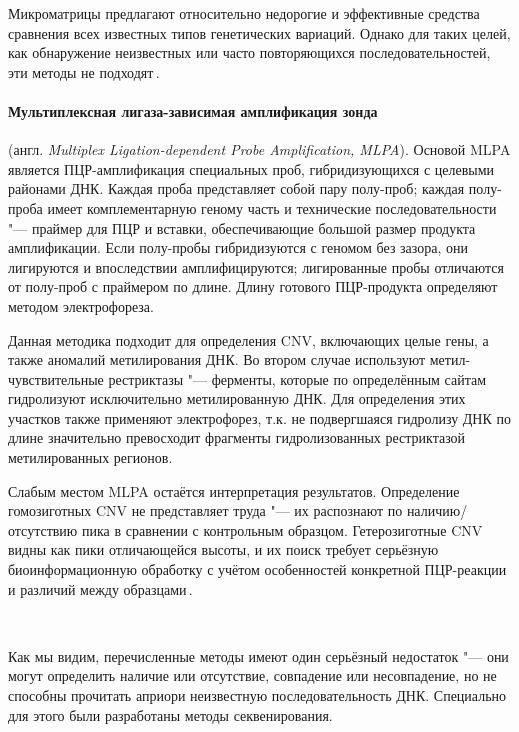 \documentclass[a4paper,14pt]{extarticle}
\newcommand{\engterm}[1]{англ. \textenglish{\textit{#1}}}
\begin{document}
Микроматрицы предлагают относительно недорогие и эффективные средства сравнения всех известных типов генетических вариаций.
Однако для таких целей, как обнаружение неизвестных или часто повторяющихся последовательностей, эти методы не подходят\,\citep{Gresham_2008}.

\paragraph{Мультиплексная лигаза-зависимая амплификация зонда} (\engterm{Multiplex Ligation-dependent Probe Amplification, MLPA}).
Основой MLPA является ПЦР\hyp{}амплификация специальных проб, гибридизующихся с целевыми районами ДНК.
Каждая проба представляет собой пару полу-проб;
каждая полу-проба имеет комплементарную геному часть и технические последовательности "--- праймер для ПЦР и вставки, обеспечивающие большой размер продукта амплификации.
Если полу-пробы гибридизуются с геномом без зазора, они лигируются и впоследствии амплифицируются;
лигированные пробы отличаются от полу-проб с праймером по длине.
Длину готового ПЦР\hyp{}продукта определяют методом электрофореза.

Данная методика подходит для определения CNV, включающих целые гены, а также аномалий метилирования ДНК.
Во втором случае используют метил-чувствительные рестриктазы "--- ферменты, которые по определённым сайтам гидролизуют исключительно метилированную ДНК.
Для определения этих участков также применяют электрофорез, т.к. не подвергшаяся гидролизу ДНК по длине значительно превосходит фрагменты гидролизованных рестриктазой метилированных регионов.

Слабым местом MLPA остаётся интерпретация результатов.
Определение гомозиготных CNV не представляет труда "--- их распознают по наличию/отсутствию пика в сравнении с контрольным образцом.
Гетерозиготные CNV видны как пики отличающейся высоты, и их поиск требует серьёзную биоинформационную обработку с учётом особенностей конкретной ПЦР\hyp{}реакции и различий между образцами\,\citep{Stuppia_2012}.

~

Как мы видим, перечисленные методы имеют один серьёзный недостаток "--- они могут определить наличие или отсутствие, совпадение или несовпадение, но не способны прочитать априори неизвестную последовательность ДНК.
Специально для этого были разработаны методы секвенирования.
\end{document}
